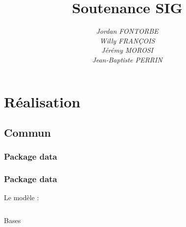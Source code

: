 \documentclass{beamer}
\begin{document}
\title{}
\title{\textbf{Soutenance SIG}}
\author[FONTORBE, FRANÇOIS, MOROSI, PERRIN]{
	\textit{Jordan FONTORBE}\\
	\textit{Willy FRANÇOIS}\\
	\textit{Jérémy MOROSI}\\
	\textit{Jean-Baptiste PERRIN}
}
\maketitle

\tableofcontents

\section{Réalisation}

\subsection{Commun}
\subsubsection{Package data}
\begin{frame}
\frametitle{Package data}

Le modèle :\\
\begin{columns}
\begin{column}{.49\textwidth}
\begin{block}{Bases}
\begin{itemize}
\end{itemize}
\end{block}
\end{column}
\begin{column}{.49\textwidth}
\end{column}
\end{columns}
\end{frame}
\end{document}
